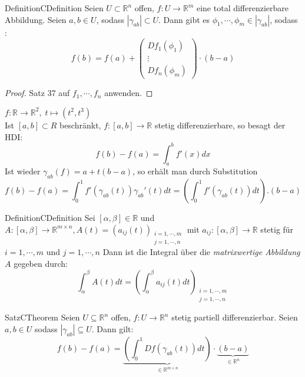 \documentclass[a4paper]{memoir}
\begin{document}
\begin{ibox}[38]{Definition}{CDefinition}
    Seien $ U \subset \mathbb{R}^n  $ offen, $ f: U \to \mathbb{R}^m  $ eine total differenzierbare Abbildung. Seien
	$ a, b \in U $, sodass $ \left| \gamma _{ab} \right|  \subset U $. Dann gibt es $ \phi_1 , \cdots, \phi_{m} 
	\in \left| \gamma_{ab} \right| $, sodass :
	$$ f \left( b \right) = f \left( a \right) + \begin{pmatrix}
		Df_1( \phi_1) \\
		\vdots \\
		Df_{n}(\phi_{m})
	\end{pmatrix} \cdot (b-a)
	 $$
\end{ibox}
\begin{proof}
	Satz 37 auf $ f_1 , \cdots, f_{n} $ anwenden. 
\end{proof}
$ f: \mathbb{R} \to \mathbb{R}^{2}, \; t \mapsto (t^{2}, t^{3}) $ 
\\
Ist $ [a,b] \subset R $ beschränkt, $ f:[a,b] \to \mathbb{R}  $ stetig differenzierbare, so besagt der HDI:
$$ f(b) - f(a) = \int_{a}^{b} f'(x) dx $$
Ist wieder $ \gamma_{ab}(f) = a + t(b-a) $, so erhält man durch Substitution 
$$ f(b) - f(a) = \int_0^{1} f'( \gamma_{ab}(t)) \gamma_{ab}'(t) dt = \left( \int_0^{1} f' \left( \gamma _{ab} (t) 
\right) dt \right) .(b-a) $$
\begin{ibox}[]{Definition}{CDefinition}
    Sei $ \left[ \alpha , \beta  \right] \in  \mathbb{R}  $ und  $ A: \left[ \alpha , \beta  \right] \to 
	\mathbb{R} ^{m \times n}, A(t) = \left( a_{ij}(t) \right)_{ \substack{ i = 1 , \cdots, m \\ j = 1 , \cdots, n }}$ 
	mit $ a_{ij}: \left[ \alpha , \beta  \right] \to \mathbb{R}  $ stetig für $ i = 1 , \cdots, m \text{ und }  j=1 , \cdots, n $ Dann ist die Integral über die \textit{matrixwertige Abbildung} $ A $ gegeben durch:
$$ \int_{ \alpha }^{ \beta }A(t) dt = \left( \int_{ \alpha }^{ \beta } a_{ij}(t) dt \right)_{\substack{ i=1 , \cdots, m \\
j = 1 , \cdots, n}} $$
\end{ibox}
\begin{ibox}[39]{Satz}{CTheorem}
    Seien $ U \subseteq \mathbb{R}^n  $ offen, $ f: U \to \mathbb{R}^n  $ stetig partiell differenzierbar. Seien 
	$ a,b \in U $ sodass $ \left| \gamma _{ab} \right| \subseteq U $. Dann gilt: 
	$$ f(b) - f(a) = \underbrace{ \left( \int_0^1 Df \left( \gamma _{ab} (t)  \right) dt \right)  }_{ \in \mathbb{R}^{
	m \times n}} \cdot \underbrace{ (b-a)}_{ \in \mathbb{R}^n } $$
\end{ibox}
\end{document}
